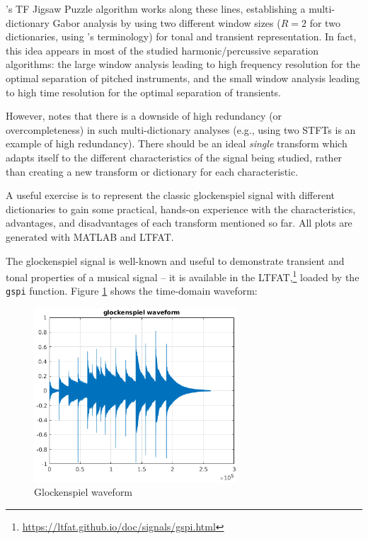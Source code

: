 \documentclass[letter,12pt,notitlepage]{article}
\begin{document}
\citet{tfjigsaw}'s TF Jigsaw Puzzle algorithm works along these lines, establishing a multi-dictionary Gabor analysis by using two different window sizes ($R = 2$ for two dictionaries, using \citet{doerflerphd}'s terminology) for tonal and transient representation. In fact, this idea appears in most of the studied harmonic/percussive separation algorithms: the large window analysis leading to high frequency resolution for the optimal separation of pitched instruments, and the small window analysis leading to high time resolution for the optimal separation of transients.

However, \citet{doerflerphd} notes that there is a downside of high redundancy (or overcompleteness) in such multi-dictionary analyses (e.g., using two STFTs is an example of high redundancy). There should be an ideal \textit{single} transform which adapts itself to the different characteristics of the signal being studied, rather than creating a new transform or dictionary for each characteristic.

A useful exercise is to represent the classic glockenspiel signal with different dictionaries to gain some practical, hands-on experience with the characteristics, advantages, and disadvantages of each transform mentioned so far. All plots are generated with MATLAB and LTFAT.

The glockenspiel signal is well-known and useful to demonstrate transient and tonal properties of a musical signal -- it is available in the LTFAT,\footnote{\url{https://ltfat.github.io/doc/signals/gspi.html}} loaded by the \Verb#gspi# function. Figure \ref{fig:glockwaveform} shows the time-domain waveform:

\begin{figure}[ht]
	\centering
	\includegraphics[height=6.5cm]{./gspi_waveform.png}
	\caption{Glockenspiel waveform}
	\label{fig:glockwaveform}
\end{figure}
\end{document}
